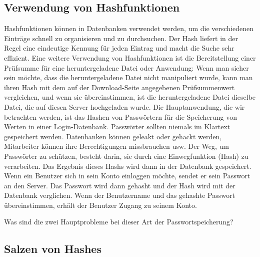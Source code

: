 \documentclass[11pt,a4paper]{report}
\begin{document}
\subsection{Verwendung von Hashfunktionen}

Hashfunktionen können in Datenbanken verwendet werden, um die verschiedenen Einträge schnell zu organisieren und zu durchsuchen.
Der Hash liefert in der Regel eine eindeutige Kennung für jeden Eintrag und macht die Suche sehr effizient.
Eine weitere Verwendung von Hashfunktionen ist die Bereitstellung einer Prüfsumme für eine heruntergeladene Datei oder Anwendung: Wenn man sicher sein möchte, dass die heruntergeladene Datei nicht manipuliert wurde, kann man ihren Hash mit dem auf der Download-Seite angegebenen Prüfsummenwert vergleichen, und wenn sie übereinstimmen, ist die heruntergeladene Datei dieselbe Datei, die auf diesen Server hochgeladen wurde.
Die Hauptanwendung, die wir betrachten werden, ist das Hashen von Passwörtern für die Speicherung von Werten in einer Login-Datenbank.
Passwörter sollten niemals im Klartext gespeichert werden. Datenbanken können geleakt oder gehackt werden, Mitarbeiter können ihre Berechtigungen missbrauchen usw. Der Weg, um Passwörter zu schützen, besteht darin, sie durch eine Einwegfunktion (Hash) zu verarbeiten.
Das Ergebnis dieses Hashs wird dann in der Datenbank gespeichert.
Wenn ein Benutzer sich in sein Konto einloggen möchte, sendet er sein Passwort an den Server.
Das Passwort wird dann gehasht und der Hash wird mit der Datenbank verglichen.
Wenn der Benutzername und das gehashte Passwort übereinstimmen, erhält der Benutzer Zugang zu seinem Konto.
\begin{ex}
Was sind die zwei Hauptprobleme bei dieser Art der Passwortspeicherung?
\end{ex}

\subsection{Salzen von Hashes}
\end{document}
